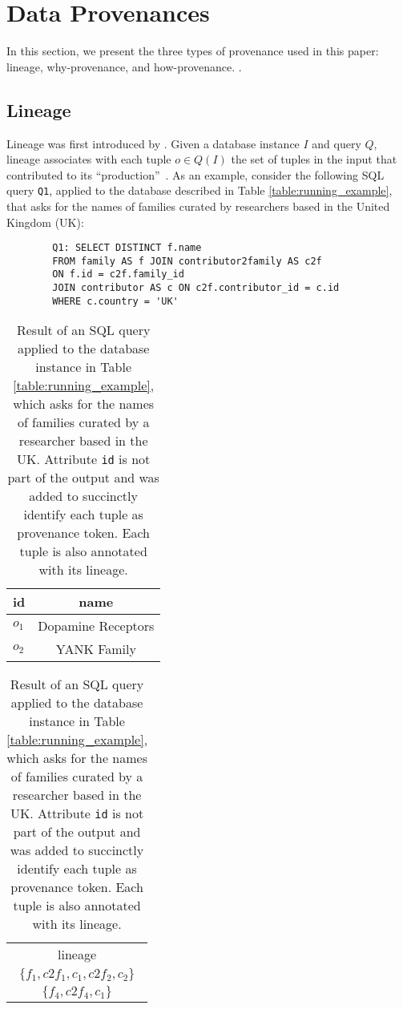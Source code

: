 \section{Data Provenances}
\label{section:preliminaries}
In this section, we present the three types of provenance used in this paper:  lineage, why-provenance, and how-provenance. 
. 

\subsection{Lineage}
Lineage was first introduced by \citet{lineageCui}. Given a database instance $I$ and query $Q$, lineage associates with each tuple $o \in Q(I)$ the set of tuples in the input
that contributed to its ``production''~\citep{CheneyProvSurvey}.
As an example, consider the following SQL query \texttt{Q1}, applied to the database described in Table \ref{table:running_example}, that asks for the names of families curated by researchers based in the United Kingdom (UK):

\vspace{2mm}
{\footnotesize
\begin{adjustwidth}{25pt}{0pt}
\begin{verbatim}
		Q1: SELECT DISTINCT f.name
		FROM family AS f JOIN contributor2family AS c2f 
		ON f.id = c2f.family_id
		JOIN contributor AS c ON c2f.contributor_id = c.id
		WHERE c.country = 'UK'
\end{verbatim}	
\end{adjustwidth}
}
\vspace{2mm}

\begin{table}[hbt]
\centering
  \begin{tabular}{|l||c|}
  \hline
    id & name\\
    \hline
    $o_1$ &  Dopamine Receptors\\
    $o_2$ & YANK Family\\
    \hline
  \end{tabular}
  \begin{tabular}{c}
  	lineage   \\
  	$\{f_1, c2f_1, c_1, c2f_2, c_2\}$ \\
  	$\{ f_4, c2f_4, c_1\}$ \\
  \end{tabular}
    \caption{Result of an SQL query applied to the database instance in Table \ref{table:running_example}, which asks for the names of families curated by a researcher based in the UK. Attribute \texttt{id} is not part of the output and was added to succinctly identify each tuple as provenance token. Each tuple is also annotated with its lineage.}
  \label{table:result}
\end{table}

